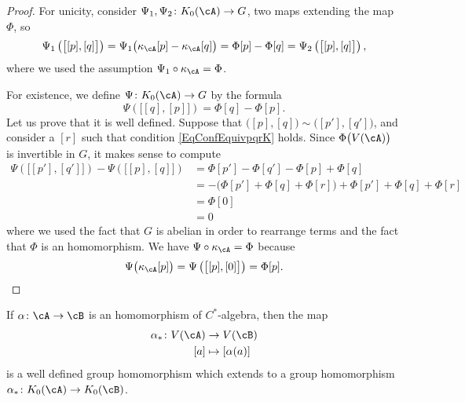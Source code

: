 \begin{proof}
For unicity, consider $\Psi_1,\Psi_2\colon K_0(\cA)\to G$, two maps extending the map $\Phi$, so
\begin{equation}
\Psi_1\left( \big[ [p],[q] \big] \right)=\Psi_1\big( \kappa_{\cA}[p]-\kappa_{\cA}[q] \big)= \Phi[p]-\Phi[q]=\Psi_2\left( \big[ [p],[q] \big] \right),
\end{equation}
where we used the assumption $\Psi_1\circ\kappa_{\cA}=\Phi$.

For existence, we define $\Psi\colon K_0(\cA)\to G$ by the formula
\begin{equation}
	\Psi\left( \big[ [q],[p] \big] \right)=\Phi[q]-\Phi[p].
\end{equation}
Let us prove that it is well defined. Suppose that $\big( [p],[q] \big)\sim \big( [p'],[q'] \big)$, and consider a $[r]$ such that condition \eqref{EqConfEquivpqrK} holds. Since $\Phi\big( V(\cA) \big)$ is invertible in $G$, it makes sense to compute
\begin{equation}
\begin{split}
\Psi\left( \big[ [p'],[q'] \big] \right)-\Psi\left( \big[ [p],[q] \big] \right)&=\Phi[p']-\Phi[q']-\Phi[p]+\Phi[q]\\
			&=-\big( \Phi[p']+\Phi[q]+\Phi[r] \big)+\Phi[p']+\Phi[q]+\Phi[r]\\
			&=\Phi[0]\\
			&=0
\end{split}
\end{equation}
where we used the fact that $G$ is abelian in order to rearrange terms and the fact that $\Phi$ is an homomorphism. We have $\Psi\circ\kappa_{\cA}=\Phi$ because
\[ 
  \Psi\big( \kappa_{\cA}[p] \big)=\Psi\left( \big[ [p],[0] \big] \right)=\Phi[p].
\]
\end{proof}

\begin{proposition}
If $\alpha\colon \cA\to \cB$ is an homomorphism of $C^*$-algebra, then the map
\begin{equation}
\begin{aligned}
 \alpha_*\colon V(\cA)&\to V(\cB) \\ 
   [a]&\mapsto [\alpha(a)] 
\end{aligned}
\end{equation}
is a well defined group homomorphism which extends to a group homomorphism $\alpha_*\colon K_0(\cA)\to K_0(\cB)$.
\end{proposition}

